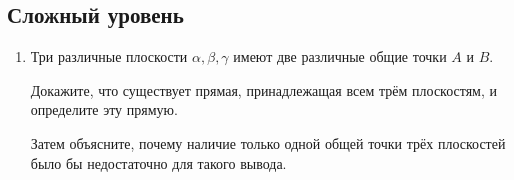 \documentclass[a4paper,12pt]{article}
\begin{document}
\subsection*{Сложный уровень}

\begin{enumerate}[label=\textbf{\arabic*.},start=10]

  \item
  Три различные плоскости
  \(\alpha,\beta,\gamma\)
  имеют две различные общие точки \(A\) и \(B\).

  Докажите, что существует прямая,
  принадлежащая всем трём плоскостям,
  и определите эту прямую.

  Затем объясните, почему наличие только одной общей точки
  трёх плоскостей было бы недостаточно для такого вывода.

\end{enumerate}
\end{document}
